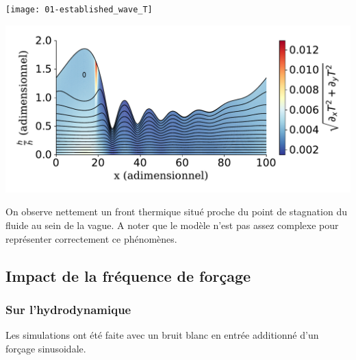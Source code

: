 \documentclass[a0,portrait,11pt]{a0poster}
\begin{document}
\begin{multicols}{2}
\begin{multicols}{2}
    \begin{center}
        \texttt{[image: 01-established\_wave\_T]}
        \label{fig:thermal}
    \end{center}
    \columnbreak
    \begin{center}
        \includegraphics[width=0.98\columnwidth]{01-established_wave_Tmag_streamlines}
        \label{fig:streamlines_thermal}
    \end{center}
\end{multicols}

On observe nettement un front thermique situé proche du point de stagnation du fluide au sein de la vague. A noter que le modèle n'est pas assez complexe pour représenter correctement ce phénomènes.

\subsection*{Impact de la fréquence de forçage}

\begin{multicols}{2}
    \subsubsection*{Sur l'hydrodynamique}
    Les simulations ont été faite avec un bruit blanc en entrée additionné d'un forçage sinusoidale.


\end{multicols}
\end{multicols}
\end{document}
